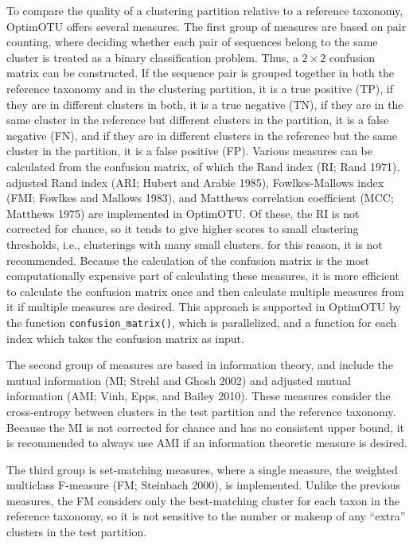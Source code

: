 \documentclass[
]{article}
\begin{document}
To compare the quality of a clustering partition relative to a reference taxonomy, OptimOTU offers several measures.
The first group of measures are based on pair counting, where deciding whether each pair of sequences belong to the same cluster is treated as a binary classification problem.
Thus, a \(2\times2\) confusion matrix can be constructed.
If the sequence pair is grouped together in both the reference taxonomy and in the clustering partition, it is a true positive (TP), if they are in different clusters in both, it is a true negative (TN), if they are in the same cluster in the reference but different clusters in the partition, it is a false negative (FN), and if they are in different clusters in the reference but the same cluster in the partition, it is a false positive (FP).
Various measures can be calculated from the confusion matrix, of which the Rand index (RI; Rand 1971), adjusted Rand index (ARI; Hubert and Arabie 1985), Fowlkes-Mallows index (FMI; Fowlkes and Mallows 1983), and Matthews correlation coefficient (MCC; Matthews 1975) are implemented in OptimOTU.
Of these, the RI is not corrected for chance, so it tends to give higher scores to small clustering thresholds, i.e., clusterings with many small clusters.
for this reason, it is not recommended.
Because the calculation of the confusion matrix is the most computationally expensive part of calculating these measures, it is more efficient to calculate the confusion matrix once and then calculate multiple measures from it if multiple measures are desired.
This approach is supported in OptimOTU by the function \texttt{confusion\_matrix()},
which is parallelized, and a function for each index which takes the confusion matrix as input.

The second group of measures are based in information theory, and include the mutual information (MI; Strehl and Ghosh 2002) and adjusted mutual information (AMI; Vinh, Epps, and Bailey 2010).
These measures consider the cross-entropy between clusters in the test partition and the reference taxonomy.
Because the MI is not corrected for chance and has no consistent upper bound, it is recommended to always use AMI if an information theoretic measure is desired.

The third group is set-matching measures, where a single measure, the weighted multiclass F-measure (FM; Steinbach 2000), is implemented.
Unlike the previous measures, the FM considers only the best-matching cluster for each taxon in the reference taxonomy, so it is not sensitive to the number or makeup of any ``extra'' clusters in the test partition.
\end{document}
